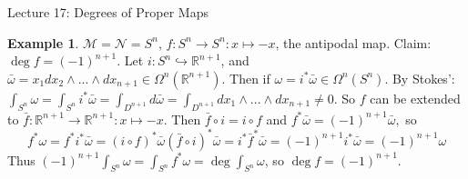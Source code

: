 \documentclass[10pt]{article}
\theoremstyle{plain}
\theoremstyle{definition}
\newtheorem{exmp}[thm]{Example} %
\newcommand{\Real}{\mathbb{R}}
\newcommand{\man}{\mathcal{M}}
\newcommand{\nan}{\mathcal{N}}
\newcommand{\allthewedge}[3]{{#1}_{#2}\wedge...\wedge{#1}_{#3}}
\newcommand{\dx}{dx}
\newcommand{\deriv}{d}
\begin{document}
\begin{section}{Lecture 17: Degrees of Proper Maps}
\begin{exmp}
$\man = \nan = S^n$, $f:S^n \to S^n : x \mapsto -x$, the antipodal map. Claim: $\deg f = (-1)^{n+1}$. Let $i: S^n \hookrightarrow \Real^{n+1}$, and $\bar{\omega} = x_1 \allthewedge{\dx}{2}{n+1} \in \Omega^n(\Real^{n+1}).$ Then if $\omega = i^* \bar{\omega} \in \Omega^n(S^n). $ By Stokes': $\int_{S^n} \omega = \int_{S^n} i^* \bar{\omega} = \int_{D^{n+1}} \deriv\bar\omega = \int_{D^{n+1}} \allthewedge{\dx}{1}{n+1} \neq 0$. So $f$ can be extended to $\bar f : \Real^{n+1} \to \Real^{n+1} : x \mapsto -x$. Then $\bar f \circ i = i\circ f$ and $f^*\bar\omega = (-1)^{n+1} \bar \omega,$ so $$f^*\omega = f^* i^* \bar \omega = (i\circ f)^* \bar \omega (\bar f \circ i) ^* \bar \omega = i^* \bar f ^* \bar \omega = (-1)^{n+1} i^* \bar \omega = (-1)^{n+1} \omega$$ Thus $(-1)^{n+1} \int_{S^n} \omega = \int_{S^n} f^* \omega = \deg \int_{S^n} \omega$, so $\deg f = (-1)^{n+1}.$
\end{exmp}
\end{section}
\end{document}
